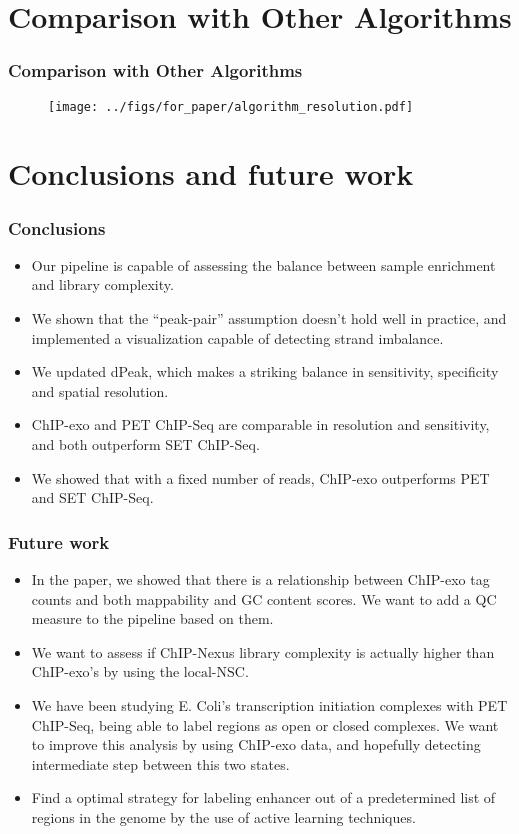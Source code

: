 \documentclass[compress,table,xcolor=dvipsnames]{beamer}\usepackage[]{graphicx}\usepackage[]{color}
\begin{document}
\section{Comparison with Other Algorithms}
\begin{frame}
\frametitle{Comparison with Other Algorithms}

\begin{figure}[H]
  \centering
  \texttt{[image: ../figs/for\_paper/algorithm\_resolution.pdf]}
\end{figure}
  
\end{frame}

\section{Conclusions and future work}

\begin{frame}
  \frametitle{Conclusions}

  \begin{itemize}
  \item Our pipeline is capable of assessing the balance between
    sample enrichment and library complexity.
  \item We shown that the ``peak-pair'' assumption doesn't hold well
    in practice, and implemented a visualization capable of detecting
    strand imbalance.
  \item We updated dPeak, which makes a striking balance in
    sensitivity, specificity and spatial resolution.
  \item ChIP-exo and PET ChIP-Seq are comparable in resolution and
    sensitivity, and both outperform SET ChIP-Seq.
  \item We showed that with a fixed number of reads, ChIP-exo
    outperforms PET and SET ChIP-Seq.
  \end{itemize}
\end{frame}




\begin{frame}
\frametitle{Future work}  

\begin{itemize}
\item In the paper, we showed that there is a relationship between
  ChIP-exo tag counts and both mappability and GC content scores. We
  want to add a QC measure to the pipeline based on them.
\item We want to assess if ChIP-Nexus library complexity is actually higher than ChIP-exo's by using the $\mbox{local-NSC}$.
\item We have been studying E. Coli's transcription initiation
  complexes with PET ChIP-Seq, being able to label regions as open or
  closed complexes. We want to improve this analysis by using ChIP-exo
  data, and hopefully detecting intermediate step between this two
  states.
\item Find a optimal strategy for labeling enhancer out of a
  predetermined list of regions in the genome by the use of active
  learning techniques.
\end{itemize}

\end{frame}
\end{document}
